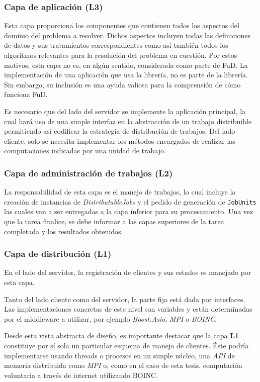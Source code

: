 \subsubsection{Capa de aplicación (L3)}

Esta capa proporciona los componentes que contienen todos los aspectos del dominio del problema a resolver. Dichos aspectos incluyen todas las definiciones
 de datos y sus tratamientos correspondientes como así también todos los algoritmos relevantes para la resolución del problema en cuestión.
Por estos motivos, esta capa no es, en algún sentido, considerada como parte de FuD. La implementación de una aplicación que usa la librería,
 no es parte de la librería. Sin embargo, su inclusión es una ayuda valiosa para la comprensión de cómo funciona FuD.

Es necesario que del lado del servidor se implemente la aplicación principal, la cual hará uso de una simple interfaz en la abstracción de un trabajo distribuible permitiendo así codificar la estrategia de distribución de trabajos.
Del lado cliente, solo se necesita implementar los métodos encargados de realizar las computaciones indicadas por una unidad de trabajo.

\subsubsection{Capa de administración de trabajos (L2)}

La responsabilidad de esta capa es el manejo de trabajos, lo cual incluye la creación de instancias de \textit{DistributableJobs}
 y el pedido de generación de \texttt{JobUnits} las cuales van a ser entregadas a la capa inferior para su procesamiento. Una vez que la tarea finalice, se debe informar a las capas superiores de la tarea completada y los resultados obtenidos.

\subsubsection{Capa de distribución (L1)}

En el lado del servidor, la registración de clientes y sus estados es manejado por esta capa. 

Tanto del lado cliente como del servidor, la parte fija está dada por interfaces. Las implementaciones concretas de este nivel son variables
 y están determinadas por el middleware a utilizar, por ejemplo \textit{Boost.Asio}, \textit{MPI} o \textit{BOINC}.  

Desde esta vista abstracta de diseño, es importante destacar que la capa \textbf{L1} constituye por sí sola un particular esquema de manejo de clientes. Éste podría implementarse usando threads o procesos en un simple núcleo, una \textit{API} de memoria distribuida como \textit{MPI} o, como en el caso de esta tesis, computación voluntaria a través de internet utilizando BOINC.

